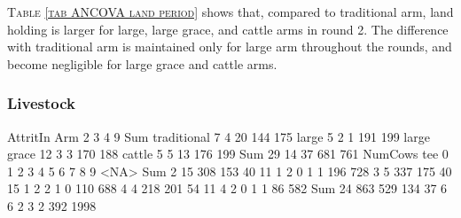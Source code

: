 \textsc{\normalsize Table \ref{tab ANCOVA land period}} shows that, compared to \textsf{traditional} arm, land holding is larger for \textsf{large}, \textsf{large grace}, and \textsf{cattle} arms in round 2. The difference with \textsf{traditional} arm is maintained only for \textsf{large} arm throughout the rounds, and become negligible for \textsf{large grace} and \textsf{cattle} arms. 


\subsubsection{Livestock}


\begin{Schunk}
\begin{Soutput}
             AttritIn
Arm             2   3   4   9 Sum
  traditional   7   4  20 144 175
  large         5   2   1 191 199
  large grace  12   3   3 170 188
  cattle        5   5  13 176 199
  Sum          29  14  37 681 761
     NumCows
tee      0    1    2    3    4    5    6    7    8    9 <NA>  Sum
  2     15  308  153   40   11    1    2    0    1    1  196  728
  3      5  337  175   40   15    1    2    2    1    0  110  688
  4      4  218  201   54   11    4    2    0    1    1   86  582
  Sum   24  863  529  134   37    6    6    2    3    2  392 1998
\end{Soutput}
\end{Schunk}



